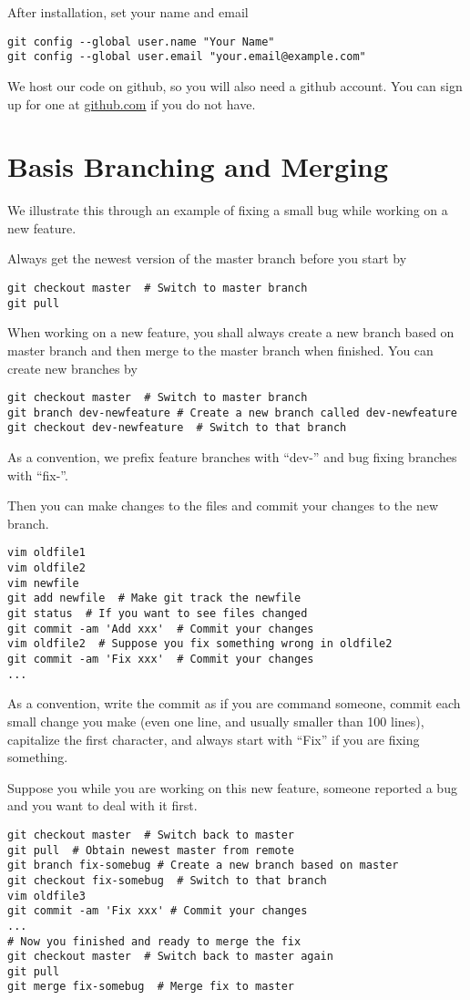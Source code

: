 \documentclass[runningheads,letterpaper]{llncs}
\begin{document}
After installation, set your name and email
\begin{verbatim}
git config --global user.name "Your Name"
git config --global user.email "your.email@example.com"
\end{verbatim}

We host our code on github, so you will also need a github account.
You can sign up for one at \url{github.com} if you do not have.

\section{Basis Branching and Merging}

We illustrate this through an example of fixing a small bug while working on a new feature.

Always get the newest version of the master branch before you start by
\begin{verbatim}
git checkout master  # Switch to master branch
git pull
\end{verbatim}

When working on a new feature, you shall always create a new branch based on master branch and then merge to the master branch when finished.
You can create new branches by
\begin{verbatim}
git checkout master  # Switch to master branch
git branch dev-newfeature # Create a new branch called dev-newfeature
git checkout dev-newfeature  # Switch to that branch
\end{verbatim}
As a convention, we prefix feature branches with ``dev-'' and bug fixing branches with ``fix-''.

Then you can make changes to the files and commit your changes to the new branch.
\begin{verbatim}
vim oldfile1
vim oldfile2
vim newfile
git add newfile  # Make git track the newfile
git status  # If you want to see files changed
git commit -am 'Add xxx'  # Commit your changes
vim oldfile2  # Suppose you fix something wrong in oldfile2
git commit -am 'Fix xxx'  # Commit your changes
...
\end{verbatim}
As a convention,
write the commit as if you are command someone,
commit each small change you make (even one line, and usually smaller than 100 lines),
capitalize the first character,
and always start with ``Fix'' if you are fixing something.

Suppose you while you are working on this new feature, someone reported a bug and you want to deal with it first.
\begin{verbatim}
git checkout master  # Switch back to master
git pull  # Obtain newest master from remote
git branch fix-somebug # Create a new branch based on master
git checkout fix-somebug  # Switch to that branch
vim oldfile3
git commit -am 'Fix xxx' # Commit your changes
...
# Now you finished and ready to merge the fix
git checkout master  # Switch back to master again
git pull
git merge fix-somebug  # Merge fix to master
\end{verbatim}
\end{document}
